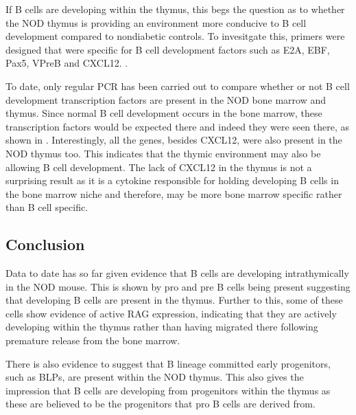 If B cells are developing within the thymus, this begs the question as to whether the NOD thymus is providing an environment more conducive to B cell development compared to nondiabetic controls. 
To invesitgate this, primers were designed that were specific for B cell development factors such as E2A, EBF, Pax5, VPreB and CXCL12.
.

To date, only regular PCR has been carried out to compare whether or not B cell development transcription factors are present in the NOD bone marrow and thymus.
Since normal B cell development occurs in the bone marrow, these transcription factors would be expected there and indeed they were seen there, as shown in . 
Interestingly, all the genes, besides CXCL12, were also present in the NOD thymus too.
This indicates that the thymic environment may also be allowing B cell development.
The lack of CXCL12 in the thymus is not a surprising result as it is a cytokine responsible for holding developing B cells in the bone marrow niche and therefore, may be more bone marrow specific rather than B cell specific.





\subsection{Conclusion}

Data to date has so far given evidence that B cells are developing intrathymically in the NOD mouse.
This is shown by pro and pre B cells being present suggesting that developing B cells are present in the thymus.
Further to this, some of these cells show evidence of active RAG expression, indicating that they are actively developing within the thymus rather than having migrated there following premature release from the bone marrow.

There is also evidence to suggest that B lineage committed early progenitors, such as BLPs, are present within the NOD thymus. 
This also gives the impression that B cells are developing from progenitors within the thymus as these are believed to be the progenitors that pro B cells are derived from.


